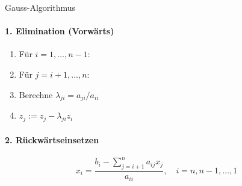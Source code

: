 \begin{KR}{Gauss-Algorithmus}
\paragraph{1. Elimination (Vorwärts)}
\begin{enumerate}
    \item Für $i=1,\ldots,n-1$:
    \item \quad Für $j=i+1,\ldots,n$:
    \item \quad\quad Berechne $\lambda_{ji} = a_{ji}/a_{ii}$
    \item \quad\quad $z_j := z_j - \lambda_{ji} z_i$
\end{enumerate}

\paragraph{2. Rückwärtseinsetzen}
$$x_i = \frac{b_i - \sum_{j=i+1}^n a_{ij}x_j}{a_{ii}}, \quad i=n,n-1,\ldots,1$$
\end{KR}

